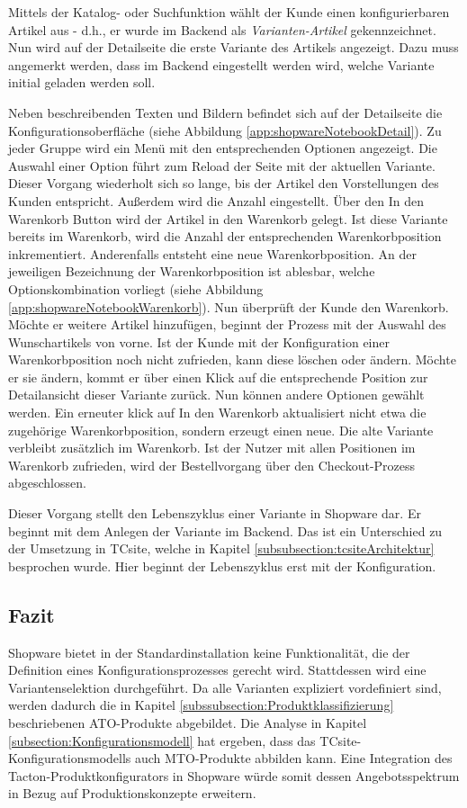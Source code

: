 \documentclass[12pt,a4paper,bibliography=totocnumbered,listof=totoc]{scrartcl}
\begin{document}
Mittels der Katalog- oder Suchfunktion wählt der Kunde einen konfigurierbaren Artikel aus - d.h., er wurde im Backend als \emph{Varianten-Artikel} gekennzeichnet. Nun wird auf der Detailseite die erste Variante des Artikels angezeigt. Dazu muss angemerkt werden, dass im Backend eingestellt werden wird, welche Variante initial geladen werden soll.

Neben beschreibenden Texten und Bildern befindet sich auf der Detailseite die Konfigurationsoberfläche (siehe Abbildung \ref{app:shopwareNotebookDetail}). Zu jeder Gruppe wird ein Menü mit den entsprechenden Optionen angezeigt. Die Auswahl einer Option führt zum Reload der Seite mit der aktuellen Variante. Dieser Vorgang wiederholt sich so lange, bis der Artikel den Vorstellungen des Kunden entspricht. Außerdem wird die Anzahl eingestellt. Über den \glqq In den Warenkorb\grqq{} Button wird der Artikel in den Warenkorb gelegt. Ist diese Variante bereits im Warenkorb, wird die Anzahl der entsprechenden Warenkorbposition inkrementiert. Anderenfalls entsteht eine neue Warenkorbposition. An der jeweiligen Bezeichnung der Warenkorbposition ist ablesbar, welche Optionskombination vorliegt (siehe Abbildung \ref{app:shopwareNotebookWarenkorb}). Nun überprüft der Kunde den Warenkorb. Möchte er weitere Artikel hinzufügen, beginnt der Prozess mit der Auswahl des Wunschartikels von vorne. Ist der Kunde mit der Konfiguration einer Warenkorbposition noch nicht zufrieden, kann diese löschen oder ändern. Möchte er sie ändern, kommt er über einen Klick auf die entsprechende Position zur Detailansicht dieser Variante zurück. Nun können andere Optionen gewählt werden. Ein erneuter klick auf \glqq In den Warenkorb\grqq{} aktualisiert nicht etwa die zugehörige Warenkorbposition, sondern erzeugt einen neue. Die alte Variante verbleibt zusätzlich im Warenkorb. Ist der Nutzer mit allen Positionen im Warenkorb zufrieden, wird der Bestellvorgang über den Checkout-Prozess abgeschlossen.

Dieser Vorgang stellt den Lebenszyklus einer Variante in Shopware dar. Er beginnt mit dem Anlegen der Variante im Backend. Das ist ein Unterschied zu der Umsetzung in TCsite, welche in Kapitel \ref{subsubsection:tcsiteArchitektur}
 besprochen wurde. Hier beginnt der Lebenszyklus erst mit der Konfiguration.

\subsection{Fazit}
Shopware bietet in der Standardinstallation keine Funktionalität, die der Definition eines Konfigurationsprozesses gerecht wird. Stattdessen wird eine Variantenselektion durchgeführt. Da alle Varianten expliziert vordefiniert sind, werden dadurch die in Kapitel \ref{subssubsection:Produktklassifizierung} beschriebenen \ac{ATO}-Produkte abgebildet. Die Analyse in Kapitel \ref{subsection:Konfigurationsmodell} hat ergeben, dass das TCsite-Konfigurationsmodells auch \ac{MTO}-Produkte abbilden kann. Eine Integration des Tacton-Produktkonfigurators in Shopware würde somit dessen Angebotsspektrum in Bezug auf Produktionskonzepte erweitern.
 
\end{document}

